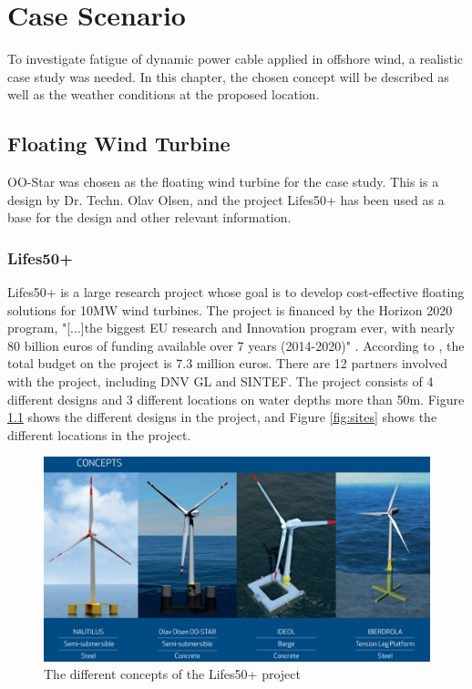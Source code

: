 \chapter{Case Scenario}
To investigate fatigue of dynamic power cable applied in offshore wind, a realistic case study was needed. In this chapter, the chosen concept will be described as well as the weather conditions at the proposed location.  
\section{Floating Wind Turbine}
OO-Star was chosen as the floating wind turbine for the case study. This is a design by Dr. Techn. Olav Olsen, and the project Lifes50+ has been used as a base for the design and other relevant information. 
\subsection{Lifes50+}
Lifes50+ is a large research project whose goal is to develop cost-effective floating solutions for 10MW wind turbines. The project is financed by the Horizon 2020 program, "[...]the biggest EU research and Innovation program ever, with nearly 80 billion euros of funding available over 7 years (2014-2020)" \cite{Horizon2010}. According to \cite{Olavolsen}, the total budget on the project is 7.3 million euros. There are 12 partners involved with the project, including DNV GL and SINTEF. The project consists of 4 different designs and 3 different locations on water depths more than 50m. Figure \ref{fig:concept} shows the different designs in the project, and Figure \ref{fig:sites} shows the different locations in the project. 

\begin{figure}[H]
\centering
\includegraphics[scale=0.4]{figures/concepts}
\caption[$\; \:$Concepts of the Lifes50+ project]{The different concepts of the Lifes50+ project \cite{Lifes50+} }
 \label{fig:concept}
\end{figure}

